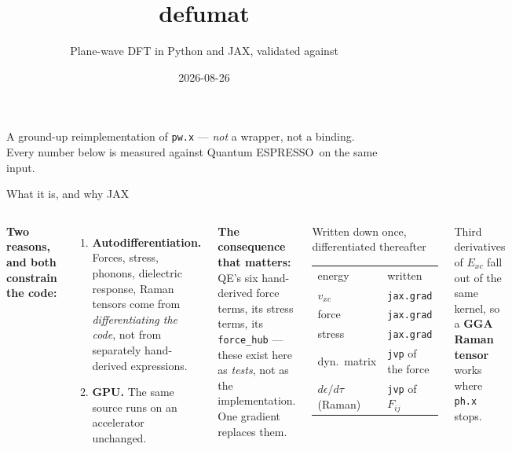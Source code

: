 \documentclass[aspectratio=169,10pt]{beamer}
\title{\textbf{defumat}}
\subtitle{Plane-wave DFT in Python and JAX, validated against \qe}
\date{2026-08-26}
\newcommand{\qe}{Quantum ESPRESSO}
\begin{document}
\begin{frame}\titlepage
\begin{center}\small
A ground-up reimplementation of \texttt{pw.x} --- \emph{not} a wrapper, not a binding.\\
Every number below is measured against \qe\ on the same input.
\end{center}
\end{frame}

\begin{frame}{What it is, and why JAX}
\begin{columns}[T]
\textbf{Two reasons, and both constrain the code:}
\begin{enumerate}
  \item \textbf{Autodifferentiation.} Forces, stress, phonons, dielectric
    response, Raman tensors come from \emph{differentiating the code}, not from
    separately hand-derived expressions.
  \item \textbf{GPU.} The same source runs on an accelerator unchanged.
\end{enumerate}
\vspace{4pt}
\textbf{The consequence that matters:}\\
QE's six hand-derived force terms, its stress terms, its \texttt{force\_hub} ---
these exist here as \emph{tests}, not as the implementation. One gradient
replaces them.
\footnotesize
\begin{block}{Written down once, differentiated thereafter}
\begin{tabular}{ll}
\toprule
energy & written \\
$v_{xc}$ & \texttt{jax.grad} \\
force & \texttt{jax.grad} \\
stress & \texttt{jax.grad} \\
dyn.\ matrix & \texttt{jvp} of the force \\
$d\epsilon/d\tau$ (Raman) & \texttt{jvp} of $F_{ij}$ \\
\bottomrule
\end{tabular}
\end{block}
Third derivatives of $E_{xc}$ fall out of the same kernel, so a \textbf{GGA
Raman tensor} works where \texttt{ph.x} stops.
\end{columns}
\end{frame}
\end{document}
